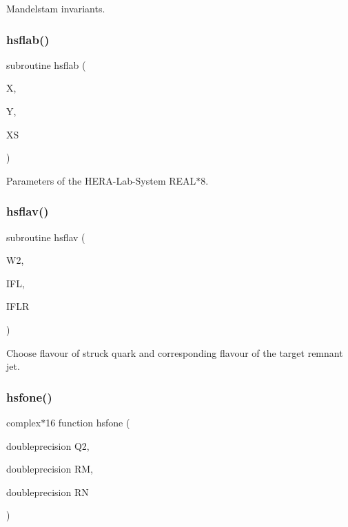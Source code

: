 Mandelstam invariants. 

\mbox{\label{djangoh__h_8f_a9b4f42a37858a1836e8a5353d37b84a4}} 
\subsubsection{\texorpdfstring{hsflab()}{hsflab()}}
{\footnotesize\ttfamily subroutine hsflab (\begin{DoxyParamCaption}\item[{}]{X,  }\item[{}]{Y,  }\item[{}]{XS }\end{DoxyParamCaption})}



Parameters of the H\+E\+R\+A-\/\+Lab-\/\+System R\+E\+A\+L$\ast$8. 

\mbox{\label{djangoh__h_8f_a42edf242e7e178839f71084e9df90f74}} 
\subsubsection{\texorpdfstring{hsflav()}{hsflav()}}
{\footnotesize\ttfamily subroutine hsflav (\begin{DoxyParamCaption}\item[{}]{W2,  }\item[{}]{I\+FL,  }\item[{}]{I\+F\+LR }\end{DoxyParamCaption})}



Choose flavour of struck quark and corresponding flavour of the target remnant jet. 

\mbox{\label{djangoh__h_8f_aa5192bede58469d1b57ed2aa1ee4b27b}} 
\subsubsection{\texorpdfstring{hsfone()}{hsfone()}}
{\footnotesize\ttfamily complex$\ast$16 function hsfone (\begin{DoxyParamCaption}\item[{doubleprecision}]{Q2,  }\item[{doubleprecision}]{RM,  }\item[{doubleprecision}]{RN }\end{DoxyParamCaption})}

